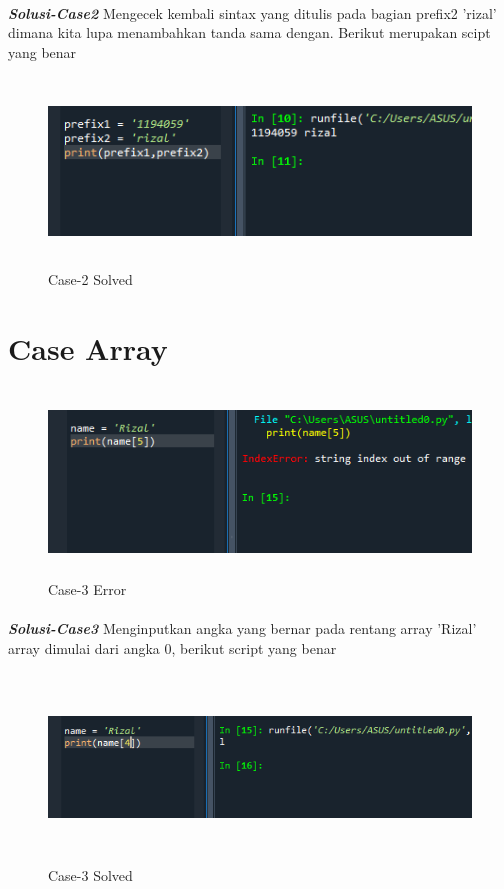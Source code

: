 \documentclass[12pt,a4paper]{article}
\begin{document}
\paragraph{}\textbf{\textit{Solusi-Case2}} { Mengecek kembali sintax yang ditulis pada bagian prefix2 'rizal' dimana kita lupa menambahkan tanda sama dengan. Berikut merupakan scipt yang benar}
\begin{figure}[ht]
    \centerline{\includegraphics[width=15cm,height=5cm]{image/case2-solved.png}}
    \renewcommand{\figurename}{Gambar}
    \caption{Case-2 Solved}
\end{figure}

\newpage
\section{Case Array}
\begin{figure}[ht]
    \centerline{\includegraphics[width=15cm,height=5cm]{image/case3.png}}
    \renewcommand{\figurename}{Gambar}
    \caption{Case-3 Error}
\end{figure}
\paragraph{}\textbf{\textit{Solusi-Case3}} { Menginputkan angka yang bernar pada rentang array 'Rizal' array dimulai dari angka 0, berikut script yang benar}
\begin{figure}[ht]
    \centerline{\includegraphics[width=15cm,height=5cm]{image/case3-solved.png}}
    \renewcommand{\figurename}{Gambar}
    \caption{Case-3 Solved}
\end{figure}
\end{document}
